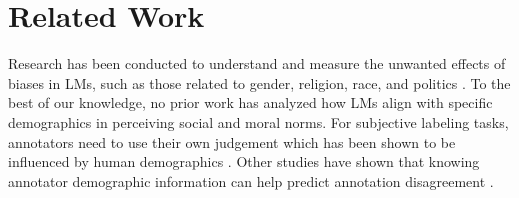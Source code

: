 \section{Related Work}
Research has been conducted to understand and measure the unwanted effects of biases in LMs, such as those related to gender, religion, race, and politics \citep{zhao-etal-2017-men, naous-etal-2024-beer, blodgett-etal-2020-language, motoki2023more, hartmann2023politicalideologyconversationalai}.  To the best of our knowledge, no prior work has analyzed how LMs align with specific demographics in perceiving social and moral norms. For subjective labeling tasks, annotators need to use their own judgement which has been shown to be influenced by human demographics \citep{sap-etal-2022-annotators, luo-etal-2020-detecting, goyal2022toxicity}. Other studies have shown that knowing annotator demographic information can help predict annotation disagreement \citep{wan2023demographic}. %